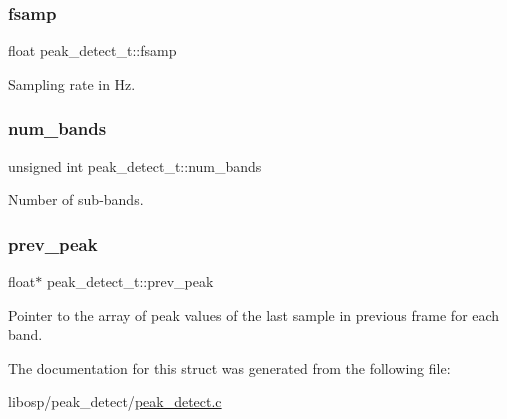 \subsubsection{\texorpdfstring{fsamp}{fsamp}}
{\footnotesize\ttfamily float peak\+\_\+detect\+\_\+t\+::fsamp}



Sampling rate in Hz. 

\mbox{\label{structpeak__detect__t_a18c7ff3dea1f1dafdab996fe12814366}} 
\subsubsection{\texorpdfstring{num\+\_\+bands}{num\_bands}}
{\footnotesize\ttfamily unsigned int peak\+\_\+detect\+\_\+t\+::num\+\_\+bands}



Number of sub-\/bands. 

\mbox{\label{structpeak__detect__t_a8496e738e882dd4cd75279b874ed9297}} 
\subsubsection{\texorpdfstring{prev\+\_\+peak}{prev\_peak}}
{\footnotesize\ttfamily float$\ast$ peak\+\_\+detect\+\_\+t\+::prev\+\_\+peak}



Pointer to the array of peak values of the last sample in previous frame for each band. 



The documentation for this struct was generated from the following file\+:\begin{DoxyCompactItemize}
\item 
libosp/peak\+\_\+detect/\mbox{\hyperlink{peak__detect_8c}{peak\+\_\+detect.\+c}}\end{DoxyCompactItemize}
